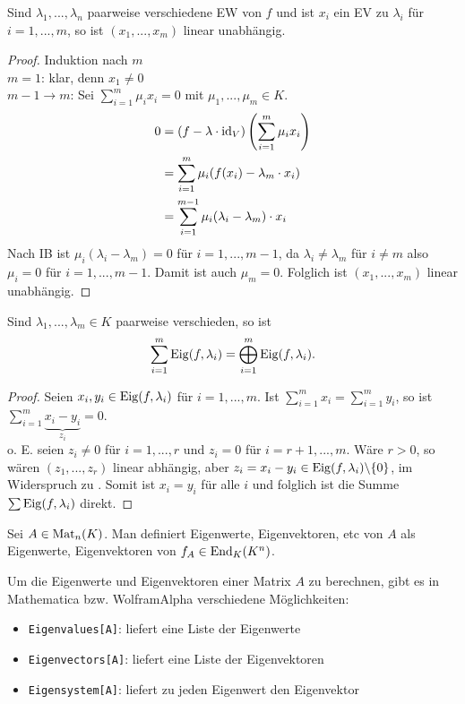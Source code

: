 \begin{lemma}
	Sind $\lambda_1,...,\lambda_n$ paarweise verschiedene EW von $f$ und ist $x_i$ ein EV zu $\lambda_i$ für $i=1,...,m$, so ist $(x_1,...,x_m)$ linear unabhängig.
\end{lemma}
\begin{proof}
	Induktion nach $m$\\
	\emph{$m=1$}: klar, denn $x_1\neq 0$ \\
	\emph{$m-1\to m$}: Sei $\sum_{i=1}^m \mu_i x_i=0$ mit $\mu_1,...,\mu_m\in K$.
	\begin{align}
		0&= (f-\lambda\cdot\operatorname{id}_V)\left( \sum\limits_{i=1}^m \mu_i x_i\right) \notag \\
		&= \sum\limits_{i=1}^m \mu_i(f(x_i)-\lambda_m\cdot x_i) \notag \\
		&= \sum\limits_{i=1}^{m-1} \mu_i(\lambda_i-\lambda_m)\cdot x_i \notag
	\end{align} 
	Nach IB ist $\mu_i(\lambda_i-\lambda_m)=0$ für $i=1,...,m-1$, da $\lambda_i\neq\lambda_m$ für $i\neq m$ also $\mu_i=0$ für $i=1,...,m-1$. Damit ist auch $\mu_m=0$. Folglich ist $(x_1,...,x_m)$ linear unabhängig.
\end{proof}

\begin{proposition}
	Sind $\lambda_1,...,\lambda_m\in K$ paarweise verschieden, so ist 
	\[\sum\limits_{i=1}^m \operatorname{Eig}(f,\lambda_i)=\bigoplus_{i=1}^{m}\operatorname{Eig}(f,\lambda_i).\]
\end{proposition}
\begin{proof}
	Seien $x_i,y_i\in\operatorname{Eig}(f,\lambda_i)$ für $i=1,...,m$. Ist $\sum_{i=1}^m x_i=\sum_{i=1}^m y_i$, so ist $\sum_{i=1}^m \underbrace{x_i-y_i}_{z_i}=0$.\\
	o. E. seien $z_i\neq 0$ für $i=1,...,r$ und $z_i=0$ für $i=r+1,...,m$. Wäre $r>0$, so wären $(z_1,...,z_r)$ linear abhängig, aber $z_i=x_i-y_i\in\operatorname{Eig}(f,\lambda_i)\backslash\{0\}$, im Widerspruch zu . Somit ist $x_i=y_i$ für alle $i$ und folglich ist die Summe $\sum\operatorname{Eig}(f,\lambda_i)$ direkt.
\end{proof}

\begin{definition}
	Sei $A\in\operatorname{Mat}_n(K)$. Man definiert Eigenwerte, Eigenvektoren, etc von $A$ als Eigenwerte, Eigenvektoren von $f_A\in\operatorname{End}_K(K^n)$.
\end{definition}

\begin{mathematica}
	Um die Eigenwerte und Eigenvektoren einer Matrix $A$ zu berechnen, gibt es in Mathematica bzw. WolframAlpha verschiedene Möglichkeiten:
	\begin{itemize}
		\item \texttt{Eigenvalues[A]}: liefert eine Liste der Eigenwerte
		\item \texttt{Eigenvectors[A]}: liefert eine Liste der Eigenvektoren
		\item \texttt{Eigensystem[A]}: liefert zu jeden Eigenwert den Eigenvektor
	\end{itemize}
\end{mathematica}


